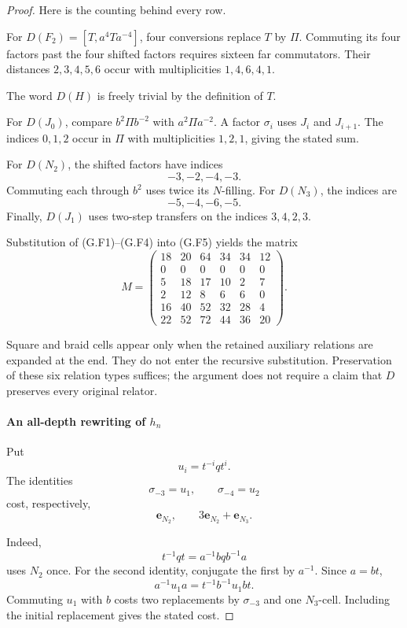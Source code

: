 \begin{proof}
Here is the counting behind every row.

For \(D(F_2)=[T,a^4Ta^{-4}]\), four conversions replace \(T\) by \(\Pi\). Commuting its four factors past the four shifted factors requires sixteen far commutators. Their distances \(2,3,4,5,6\) occur with multiplicities \(1,4,6,4,1\).

The word \(D(H)\) is freely trivial by the definition of \(T\).

For \(D(J_0)\), compare \(b^2\Pi b^{-2}\) with \(a^2\Pi a^{-2}\). A factor \(\sigma_i\) uses \(J_i\) and \(J_{i+1}\). The indices \(0,1,2\) occur in \(\Pi\) with multiplicities \(1,2,1\), giving the stated sum.

For \(D(N_2)\), the shifted factors have indices
\[
-3,-2,-4,-3.
\]
Commuting each through \(b^2\) uses twice its \(N\)-filling. For \(D(N_3)\), the indices are
\[
-5,-4,-6,-5.
\]
Finally, \(D(J_1)\) uses two-step transfers on the indices \(3,4,2,3\).

Substitution of (G.F1)--(G.F4) into (G.F5) yields the matrix
\[
M=
\begin{pmatrix}
18&20&64&34&34&12\\
0&0&0&0&0&0\\
5&18&17&10&2&7\\
2&12&8&6&6&0\\
16&40&52&32&28&4\\
22&52&72&44&36&20
\end{pmatrix}. \tag{G.F6}
\]

Square and braid cells appear only when the retained auxiliary relations are expanded at the end. They do not enter the recursive substitution. Preservation of these six relation types suffices; the argument does not require a claim that \(D\) preserves every original relator.

\paragraph{An all-depth rewriting of \(h_n\)}

Put
\[
u_i=t^{-i}qt^i.
\]
The identities
\[
\sigma_{-3}=u_1,\qquad \sigma_{-4}=u_2
\]
cost, respectively,
\[
\mathbf e_{N_2},\qquad
3\mathbf e_{N_2}+\mathbf e_{N_3}.
\]

Indeed,
\[
t^{-1}qt=a^{-1}bqb^{-1}a
\]
uses \(N_2\) once. For the second identity, conjugate the first by \(a^{-1}\). Since \(a=bt\),
\[
a^{-1}u_1a=t^{-1}b^{-1}u_1bt.
\]
Commuting \(u_1\) with \(b\) costs two replacements by \(\sigma_{-3}\) and one \(N_3\)-cell. Including the initial replacement gives the stated cost.


\end{proof}
